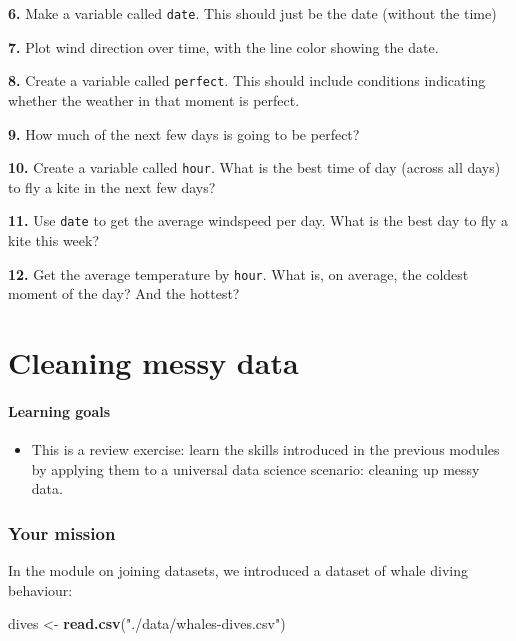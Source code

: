 \documentclass[]{book}
\newenvironment{Shaded}{\begin{snugshade}}{\end{snugshade}}
\newcommand{\KeywordTok}[1]{\textcolor[rgb]{0.13,0.29,0.53}{\textbf{#1}}}
\newcommand{\NormalTok}[1]{#1}
\newcommand{\StringTok}[1]{\textcolor[rgb]{0.31,0.60,0.02}{#1}}
\providecommand{\tightlist}{%
  \setlength{\itemsep}{0pt}\setlength{\parskip}{0pt}}
\begin{document}
\textbf{6.} Make a variable called \texttt{date}. This should just be the date (without the time)

\textbf{7.} Plot wind direction over time, with the line color showing the date.

\textbf{8.} Create a variable called \texttt{perfect}. This should include conditions indicating whether the weather in that moment is perfect.

\textbf{9.} How much of the next few days is going to be perfect?

\textbf{10.} Create a variable called \texttt{hour}. What is the best time of day (across all days) to fly a kite in the next few days?

\textbf{11.} Use \texttt{date} to get the average windspeed per day. What is the best day to fly a kite this week?

\textbf{12.} Get the average temperature by \texttt{hour}. What is, on average, the coldest moment of the day? And the hottest?

\hypertarget{cleaning-messy-data}{%
\chapter{Cleaning messy data}\label{cleaning-messy-data}}

\hypertarget{learning-goals-21}{%
\subsubsection*{Learning goals}\label{learning-goals-21}}

\begin{itemize}
\tightlist
\item
  This is a review exercise: learn the skills introduced in the previous modules by applying them to a universal data science scenario: cleaning up messy data.
\end{itemize}

\hypertarget{your-mission}{%
\subsection*{Your mission}\label{your-mission}}

In the module on joining datasets, we introduced a dataset of whale diving behaviour:

\begin{Shaded}
\begin{Highlighting}[]
\NormalTok{dives <-}\StringTok{ }\KeywordTok{read.csv}\NormalTok{(}\StringTok{"./data/whales-dives.csv"}\NormalTok{)}
\end{Highlighting}
\end{Shaded}
\end{document}

